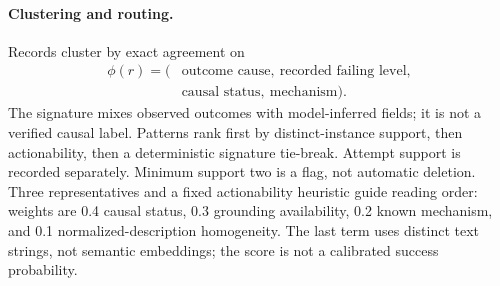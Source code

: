 \paragraph{Clustering and routing.}
Records cluster by exact agreement on
\[
\begin{aligned}
\phi(r)=(&\text{outcome cause},\ \text{recorded failing level},\\
          &\text{causal status},\ \text{mechanism}).
\end{aligned}
\]
The signature mixes observed outcomes with model-inferred fields; it is not a
verified causal label. Patterns rank first by distinct-instance support, then
actionability, then a deterministic signature tie-break. Attempt support is
recorded separately. Minimum support two is a flag, not automatic deletion.
Three representatives and a fixed actionability heuristic guide reading order:
weights are 0.4 causal status, 0.3 grounding availability, 0.2 known mechanism,
and 0.1 normalized-description homogeneity. The last term uses distinct text
strings, not semantic embeddings; the score is not a calibrated success
probability.

